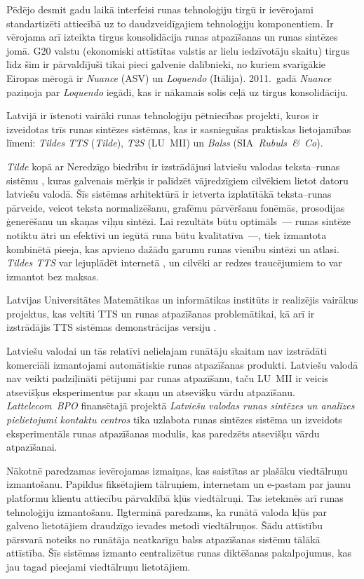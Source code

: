 \begin{multicols}{2}
Pēdējo desmit gadu laikā interfeisi runas tehnoloģiju tirgū ir ievērojami standartizēti attiecībā uz to daudzveidīgajiem tehnoloģiju komponentiem.
Ir vērojama arī izteikta tirgus konsolidācija runas atpazīšanas un runas sintēzes jomā.
G20 valstu (ekonomiski attīstītas valstis ar lielu iedzīvotāju skaitu) tirgus līdz šim ir pārvaldījuši tikai pieci galvenie dalībnieki, no kuriem svarīgākie Eiropas mērogā ir \textit{Nuance} (ASV) un \textit{Loquendo} (Itālija).
2011.~gadā \textit{Nuance} paziņoja par \textit{Loquendo} iegādi, kas ir nākamais solis ceļā uz tirgus konsolidāciju.

Latvijā ir īstenoti vairāki runas tehnoloģiju pētniecības projekti, kuros ir izveidotas trīs runas sintēzes sistēmas, kas ir sasniegušas praktiskas lietojamības līmeni: \textit{Tildes TTS} (\textit{Tilde}), \textit{T2S} (LU~MII) un \textit{Balss} (SIA\textit{~Rubuls~\&~Co}). 

\textit{Tilde} kopā ar Neredzīgo biedrību ir izstrādājusi latviešu valodas teksta--runas sistēmu \cite{Meta19}, kuras galvenais mērķis ir palīdzēt vājredzīgiem cilvēkiem lietot datoru latviešu valodā.
Šīs sistēmas arhitektūrā ir ietverta izplatītākā teksta--runas pārveide, veicot teksta normalizēšanu, grafēmu pārvēršanu fonēmās, prosodijas ģenerēšanu un skaņas viļņu sintēzi.
Lai rezultāts būtu optimāls~--- runas sintēze notiktu ātri un efektīvi un iegūtā runa būtu kvalitatīva~---, tiek izmantota kombinētā pieeja, kas apvieno dažādu garumu runas vienību sintēzi un atlasi. 
\textit{Tildes TTS} var lejuplādēt internetā \cite{Meta58}, un cilvēki ar redzes traucējumiem to var izmantot bez maksas.

Latvijas Universitātes Matemātikas un informātikas institūts ir realizējis vairākus projektus, kas veltīti TTS \cite{Meta20} \cite{Meta21} un runas atpazīšanas problemātikai, kā arī ir izstrādājis TTS sistēmas demonstrācijas versiju \cite{Meta22}.

Latviešu valodai un tās relatīvi nelielajam runātāju skaitam nav izstrādāti komerciāli izmantojami automātiskie runas atpazīšanas produkti.
Latviešu valodā nav veikti padziļināti pētījumi par runas atpazīšanu, taču LU~MII ir veicis atsevišķus eksperimentus par skaņu un atsevišķu vārdu atpazīšanu.
\textit{Lattelecom~BPO} finansētajā projektā \textit{Latviešu valodas runas sintēzes un analīzes pielietojumi kontaktu centros} tika uzlabota runas sintēzes sistēma un izveidots eksperimentāls runas atpazīšanas modulis, kas paredzēts atsevišķu vārdu atpazīšanai.

Nākotnē paredzamas ievērojamas izmaiņas, kas saistītas ar plašāku viedtālruņu izmantošanu.
Papildus fiksētajiem tālruņiem, internetam un e-pastam par jaunu platformu klientu attiecību pārvaldībā kļūs viedtālruņi. 
Tas ietekmēs arī runas tehnoloģiju izmantošanu.
Ilgtermiņā paredzams, ka runātā valoda kļūs par galveno lietotājiem draudzīgo ievades metodi viedtālruņos. 
Šādu attīstību pārsvarā noteiks no runātāja neatkarīgu balss atpazīšanas sistēmu tālākā attīstība.
Šīs sistēmas izmanto centralizētus runas diktēšanas pakalpojumus, kas jau tagad pieejami viedtālruņu lietotājiem. 


\end{multicols}
